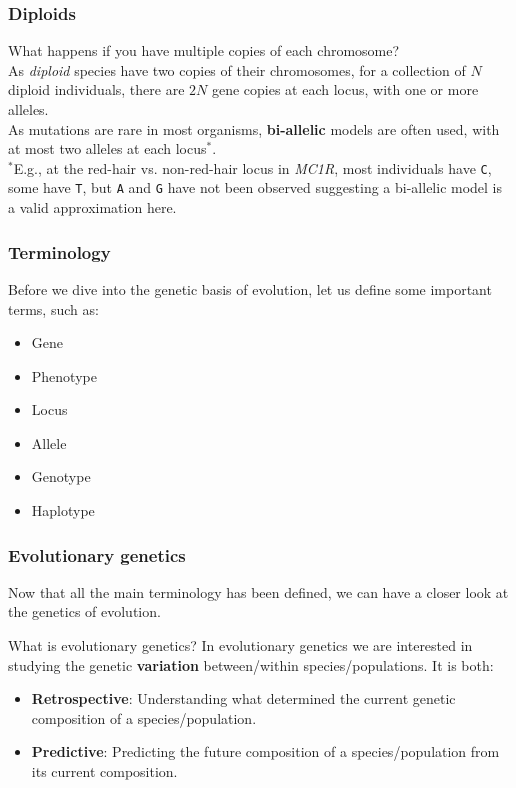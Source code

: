 \documentclass{beamer}
\newcommand{\1}{\ensuremath{\mathbf{1}}}
\begin{document}
%
%
%
\begin{frame}\frametitle{Diploids}
	What happens if you have multiple copies of each chromosome?\\[2ex]
	As \emph{diploid} species have two copies of their chromosomes, for a collection of $N$ diploid individuals, there are $2N$ gene copies at each locus, with one or more alleles.\\[2ex]
	As mutations are rare in most organisms, \textbf{bi-allelic} models are often used, with at most two alleles at each locus$^{*}$.\\[2ex]
	{\small $^{*}$E.g., at the red-hair vs. non-red-hair locus in \emph{MC1R}, most individuals have \texttt{C}, some have \texttt{T}, but \texttt{A} and \texttt{G} have not been observed suggesting a bi-allelic model is a valid approximation here.}
\end{frame}
%
%
%
\begin{frame}\frametitle{Terminology}
	Before we dive into the genetic basis of evolution, let us define some important terms, such as:
	\begin{itemize}
		\item Gene
		\item Phenotype
		\item Locus
		\item Allele
		\item Genotype
		\item Haplotype
	\end{itemize}
\end{frame}
%
%
%
\begin{frame}\frametitle{Evolutionary genetics}
	Now that all the main terminology has been defined, we can have a closer look at the genetics of evolution.
	\begin{block}{What is evolutionary genetics?}
		In evolutionary genetics we are interested in studying the genetic \textbf{variation} between/within species/populations. It is both:
		\begin{itemize}
			\item \textbf{Retrospective}: Understanding what determined the current genetic composition of a species/population.
			\item \textbf{Predictive}: Predicting the future composition of a species/population from its current composition.
		\end{itemize}
	\end{block}
\end{frame}
\end{document}
